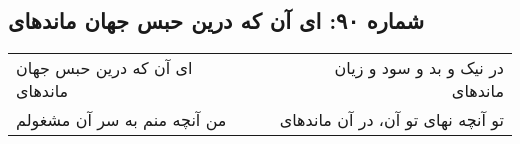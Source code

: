 \begin{center}
\section*{شماره ۹۰: ای آن که درین حبس جهان ماندهای}
\label{sec:090}
\begin{longtable}{l p{0.5cm} r}
ای آن که درین حبس جهان ماندهای
&&
در نیک و بد و سود و زیان ماندهای
\\
من آنچه منم به سر‌ آن مشغولم
&&
تو آنچه نهای تو آن، در آن ماندهای
\\
\end{longtable}
\end{center}
